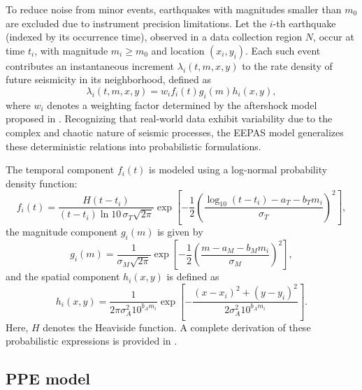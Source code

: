 \documentclass[extra,mreferee]{gji}
\theoremstyle{lemma}
\begin{document}
To reduce noise from minor events, earthquakes with magnitudes smaller than $m_0$ are excluded due to instrument precision limitations. Let the $i$-th earthquake (indexed by its occurrence time), observed in a data collection region $N$, occur at time $t_i$, with magnitude $m_i \geq m_0$ and location $(x_i, y_i)$. Each such event contributes an instantaneous increment $\lambda_i(t,m,x,y)$ to the rate density of future seismicity in its neighborhood, defined as
\begin{equation}\label{li}
    \lambda_i(t,m,x,y) = w_i f_i(t) g_i(m) h_i(x,y),
\end{equation}
where $w_i$ denotes a weighting factor determined by the aftershock model proposed in \cite{Rhoades}. Recognizing that real-world data exhibit variability due to the complex and chaotic nature of seismic processes, the EEPAS model generalizes these deterministic relations into probabilistic formulations.

The temporal component $f_i(t)$ is modeled using a log-normal probability density function:
\begin{equation}\label{ft}
    f_i(t) = \frac{H(t - t_i)}{(t - t_i)\ln 10\, \sigma_T \sqrt{2\pi}} \exp{\left[ -\frac{1}{2} \left( \frac{\log_{10}(t - t_i) - a_T - b_T m_i}{\sigma_T} \right)^2 \right]},
\end{equation}
the magnitude component $g_i(m)$ is given by
\begin{equation}\label{gm}
    g_i(m) = \frac{1}{\sigma_M \sqrt{2\pi}} \exp{\left[ -\frac{1}{2} \left( \frac{m - a_M - b_M m_i}{\sigma_M} \right)^2 \right]},
\end{equation}
and the spatial component $h_i(x,y)$ is defined as
\begin{equation}\label{hxy}
    h_i(x,y) = \frac{1}{2\pi \sigma_A^2 10^{b_A m_i}} \exp{\left[ -\frac{(x - x_i)^2 + (y - y_i)^2}{2 \sigma_A^2 10^{b_A m_i}} \right]}.
\end{equation}
Here, $H$ denotes the Heaviside function. A complete derivation of these probabilistic expressions is provided in .


\subsection{PPE model}
\end{document}

